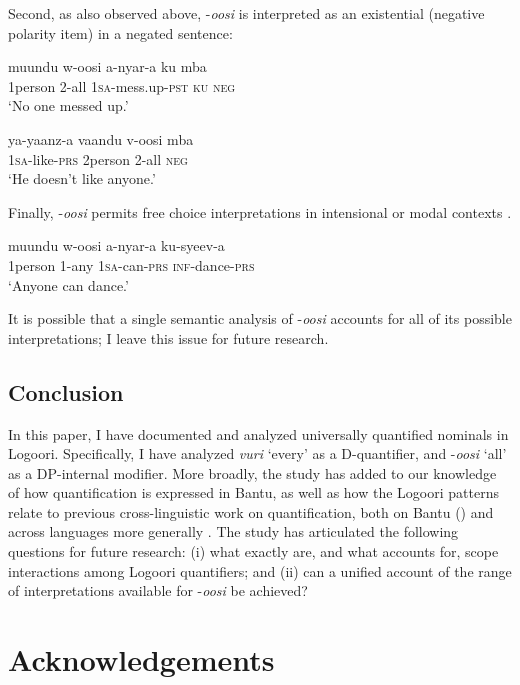\documentclass[output=paper]{langsci/langscibook}
\begin{document}
  Second, as also observed above, -\textit{oosi} is interpreted as an existential (negative polarity item) in a negated sentence:  

\ea 
\gll muundu  w-oosi    a-nyar-a    ku  mba  \\
     1person  2-all    1\textsc{sa}-mess.up-\textsc{pst}  \textsc{ku}  \textsc{neg}\\
\glt ‘No one messed up.’        
\z

\ea
\gll ya-yaanz-a  vaandu   v-oosi    mba \\
     1\textsc{sa}-like-\textsc{prs}  2person     2-all    \textsc{neg}\\
\glt ‘He doesn't like anyone.’
\z

  Finally, -\textit{oosi} permits free choice interpretations in intensional or modal contexts .

\ea
\gll muundu  w-oosi    a-nyar-a  ku-syeev-a\\
     1person  1-any    1\textsc{sa}-can-\textsc{prs}  \textsc{inf-}dance-\textsc{prs} \\
\glt ‘Anyone can dance.’
\z

It is possible that a single semantic analysis of -\textit{oosi} accounts for all of its possible interpretations; I leave this issue for future research. 

\section{Conclusion}

In this paper, I have documented and analyzed universally quantified nominals in Logoori. Specifically, I have analyzed \textit{vuri} ‘every’ as a D-quantifier, and -\textit{oosi} ‘all’ as a DP-internal modifier. More broadly, the study has added to our knowledge of how quantification is expressed in Bantu, as well as how the Logoori patterns relate to previous cross-linguistic work on quantification, both on Bantu (\citealt{ZerbianKrifka2008}) and across languages more generally \citep{Matthewson2013}. The study has articulated the following questions for future research: (i) what exactly are, and what accounts for, scope interactions among Logoori quantifiers; and (ii) can a unified account of the range of interpretations available for -\textit{oosi} be achieved?

\chapter{Acknowledgements}
\end{document}
